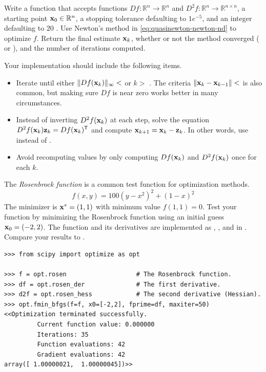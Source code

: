 \begin{problem}
Write a function that accepts functions $Df:\mathbb{R}^n\rightarrow\mathbb{R}^n$ and $D^2f:\mathbb{R}^n\rightarrow\mathbb{R}^{n\times n}$, a starting point $\mathbf{x}_0 \in \mathbb{R}^n$,  a stopping tolerance  defaulting to $1e^{-5}$, and an integer  defaulting to $20$ .
Use Newton's method in \eqref{eq:quasinewton-newton-nd} to optimize $f$.
Return the final estimate $\mathbf{x}_k$, whether or not the method converged ( or ), and the number of iterations computed.

Your implementation should include the following items.
\begin{itemize}
    \item Iterate until either $\|Df(\mathbf{x}_{k})\|_\infty <$  or $k >$ .
    The criteria $\|\mathbf{x}_{k} - \mathbf{x}_{k-1}\| <$  is also common, but making sure $Df$ is near zero works better in many circumstances.
    \item Instead of inverting $D^2 f(\mathbf{x}_k)$ at each step, solve the equation $D^2 f(\mathbf{x}_k)\mathbf{z}_k = D f(\mathbf{x}_k)^{\mathsf T}$ and compute $\mathbf{x}_{k+1} = \mathbf{x}_k - \mathbf{z}_k$.
    In other words, use  instead of .
    \item Avoid recomputing values by only computing $Df(\mathbf{x}_k)$ and $D^2f(\mathbf{x}_k)$ once for each $k$.
\end{itemize}
%
The \emph{Rosenbrock function} is a common test function for optimization methods.
\[
f(x,y) = 100(y - x^2)^2 + (1 - x)^2
\]
The minimizer is $\mathbf{x}^* = (1,1)$ with minimum value $f(1,1) = 0$.
Test your function by minimizing the Rosenbrock function using an initial guess $\mathbf{x}_0 = (-2,2)$.
The function and its derivatives are implemented as , , and  in .
Compare your results to .
\begin{lstlisting}
>>> from scipy import optimize as opt

>>> f = opt.rosen                   # The Rosenbrock function.
>>> df = opt.rosen_der              # The first derivative.
>>> d2f = opt.rosen_hess            # The second derivative (Hessian).
>>> opt.fmin_bfgs(f=f, x0=[-2,2], fprime=df, maxiter=50)
<<Optimization terminated successfully.
         Current function value: 0.000000
         Iterations: 35
         Function evaluations: 42
         Gradient evaluations: 42
array([ 1.00000021,  1.00000045])>>
\end{lstlisting}
\label{prob:quasinewton-newton}
\end{problem}

